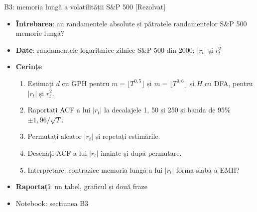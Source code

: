 \begin{frame}{B3: memoria lungă a volatilității S\&P 500 [Rezolvat]}
\itemsize{\footnotesize}
\begin{itemize}
\item \textbf{Întrebarea}: au randamentele absolute și pătratele randamentelor S\&P 500 memorie lungă?
\item \textbf{Date}: randamentele logaritmice zilnice S\&P 500 din 2000; $|r_t|$ și $r_t^2$
\item \textbf{Cerințe}
\begin{enumerate}
    \item Estimați $d$ cu GPH pentru $m = \lfloor T^{0{,}5}\rfloor$ și $m = \lfloor T^{0{,}6}\rfloor$ și $H$ cu DFA, pentru $|r_t|$ și $r_t^2$.
    \item Raportați ACF a lui $|r_t|$ la decalajele 1, 50 și 250 și banda de 95\% $\pm 1{,}96/\sqrt{T}$.
    \item Permutați aleator $|r_t|$ și repetați estimările.
    \item Desenați ACF a lui $|r_t|$ înainte și după permutare.
    \item Interpretare: contrazice memoria lungă a lui $|r_t|$ forma slabă a EMH?
\end{enumerate}
\item \textbf{Raportați}: un tabel, graficul și două fraze
\item Notebook: secțiunea B3
\end{itemize}
\end{frame}

